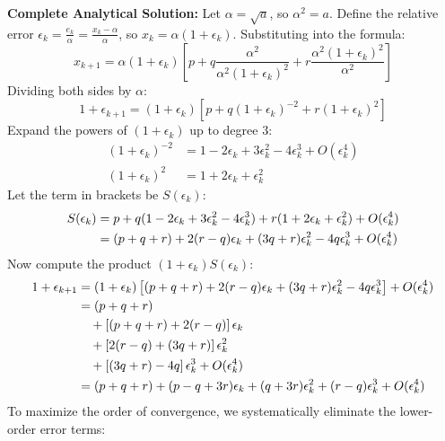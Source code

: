 \documentclass[11pt,a4paper]{article}
\numberwithin{equation}{section}
\begin{document}
\begin{solbox}
\textbf{Complete Analytical Solution:}
Let $\alpha = \sqrt{a}$, so $\alpha^2 = a$. Define the relative error $\epsilon_k = \frac{e_k}{\alpha} = \frac{x_k - \alpha}{\alpha}$, so $x_k = \alpha(1 + \epsilon_k)$. Substituting into the formula:
\begin{equation}
    x_{k+1} = \alpha(1 + \epsilon_k) \left[ p + q \frac{\alpha^2}{\alpha^2(1+\epsilon_k)^2} + r \frac{\alpha^2(1+\epsilon_k)^2}{\alpha^2} \right]
\end{equation}
Dividing both sides by $\alpha$:
\begin{equation}
    1 + \epsilon_{k+1} = (1 + \epsilon_k) \left[ p + q (1 + \epsilon_k)^{-2} + r (1 + \epsilon_k)^2 \right]
\end{equation}
Expand the powers of $(1 + \epsilon_k)$ up to degree 3:
\begin{align}
    (1 + \epsilon_k)^{-2} &= 1 - 2\epsilon_k + 3\epsilon_k^2 - 4\epsilon_k^3 + O(\epsilon_k^4) \\
    (1 + \epsilon_k)^2 &= 1 + 2\epsilon_k + \epsilon_k^2
\end{align}
Let the term in brackets be $S(\epsilon_k)$:
\begin{align}
    S(\epsilon_k) &= p + q(1 - 2\epsilon_k + 3\epsilon_k^2 - 4\epsilon_k^3) + r(1 + 2\epsilon_k + \epsilon_k^2) + O(\epsilon_k^4) \notag \\
    &= (p + q + r) + 2(r - q)\epsilon_k + (3q + r)\epsilon_k^2 - 4q\epsilon_k^3 + O(\epsilon_k^4)
\end{align}
Now compute the product $(1 + \epsilon_k) S(\epsilon_k)$:
\begin{align}
    1 + \epsilon_{k+1} &= (1 + \epsilon_k) \left[ (p + q + r) + 2(r - q)\epsilon_k + (3q + r)\epsilon_k^2 - 4q\epsilon_k^3 \right] + O(\epsilon_k^4) \notag \\
    &= (p + q + r) \notag \\
    &\quad + \left[ (p + q + r) + 2(r - q) \right] \epsilon_k \notag \\
    &\quad + \left[ 2(r - q) + (3q + r) \right] \epsilon_k^2 \notag \\
    &\quad + \left[ (3q + r) - 4q \right] \epsilon_k^3 + O(\epsilon_k^4) \notag \\
    &= (p + q + r) + (p - q + 3r)\epsilon_k + (q + 3r)\epsilon_k^2 + (r - q)\epsilon_k^3 + O(\epsilon_k^4)
\end{align}
To maximize the order of convergence, we systematically eliminate the lower-order error terms:
\begin{enumerate}[leftmargin=2em]

\end{enumerate}
\end{solbox}
\end{document}
